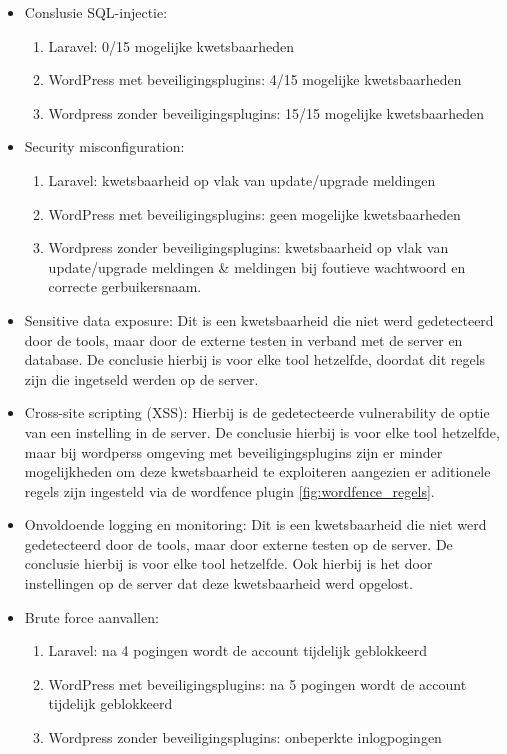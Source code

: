   \begin{itemize}
    \item Conslusie SQL-injectie:
    \begin{enumerate}
      \item Laravel: 0/15 mogelijke kwetsbaarheden
      \item WordPress met beveiligingsplugins: 4/15 mogelijke kwetsbaarheden
      \item Wordpress zonder beveiligingsplugins: 15/15 mogelijke kwetsbaarheden
    \end{enumerate}
    \item Security misconfiguration:
    \begin{enumerate}
      \item Laravel: kwetsbaarheid op vlak van update/upgrade meldingen
      \item WordPress met beveiligingsplugins: geen mogelijke kwetsbaarheden
      \item Wordpress zonder beveiligingsplugins: kwetsbaarheid op vlak van update/upgrade meldingen \& meldingen bij 
            foutieve wachtwoord en correcte gerbuikersnaam.
    \end{enumerate}
    \item Sensitive data exposure: Dit is een kwetsbaarheid die niet werd gedetecteerd door de tools, maar door de 
          externe testen in verband met de server en database. De conclusie hierbij is voor elke tool hetzelfde, doordat dit 
          regels zijn die ingetseld werden op de server.
    \item Cross-site scripting (XSS): Hierbij is de gedetecteerde vulnerability de optie van een instelling in de 
          server. De conclusie hierbij is voor elke tool hetzelfde, maar bij wordperss omgeving met beveiligingsplugins 
          zijn er minder mogelijkheden om deze kwetsbaarheid te exploiteren aangezien er aditionele regels zijn ingesteld 
          via de wordfence plugin \ref{fig:wordfence_regels}.
    \item Onvoldoende logging en monitoring: Dit is een kwetsbaarheid die niet werd gedetecteerd door de tools, maar door 
          externe testen op de server. De conclusie hierbij is voor elke tool hetzelfde. Ook hierbij is het door instellingen 
          op de server dat deze kwetsbaarheid werd opgelost.
    \item Brute force aanvallen:
    \begin{enumerate}
      \item Laravel: na 4 pogingen wordt de account tijdelijk geblokkeerd
      \item WordPress met beveiligingsplugins: na 5 pogingen wordt de account tijdelijk geblokkeerd
      \item Wordpress zonder beveiligingsplugins: onbeperkte inlogpogingen
    \end{enumerate}
  \end{itemize}


